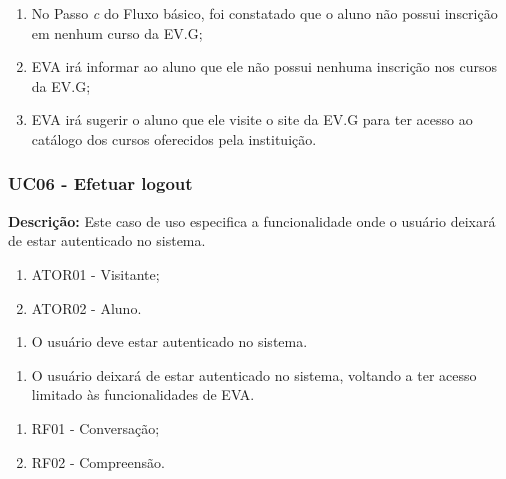     \begin{enumerate}[label=\alph*)]
        \tightlist
        \item No Passo \textit{c} do Fluxo básico, foi constatado que o aluno não possui inscrição em nenhum curso da EV.G;
        \item EVA irá informar ao aluno que ele não possui nenhuma inscrição nos cursos da EV.G;
        \item EVA irá sugerir o aluno que ele visite o site da EV.G para ter acesso ao catálogo dos cursos oferecidos pela instituição.
    \end{enumerate}

    
\subsubsection{UC06 - Efetuar logout}

\textbf{Descrição:} Este caso de uso especifica a funcionalidade onde o usuário deixará de estar autenticado no sistema.

    \begin{enumerate}[label=\alph*)]
        \tightlist
        \item ATOR01 - Visitante;
        \item ATOR02 - Aluno.
    \end{enumerate}
        
    \begin{enumerate}[label=\alph*)]
        \tightlist
        \item O usuário deve estar autenticado no sistema.
    \end{enumerate}
        
    \begin{enumerate}[label=\alph*)]
        \tightlist
        \item O usuário deixará de estar autenticado no sistema, voltando a ter acesso limitado às funcionalidades de EVA.
    \end{enumerate}
        
    \begin{enumerate}[label=\alph*)]
        \tightlist
        \item RF01 - Conversação;
        \item RF02 - Compreensão.
    \end{enumerate}
        
